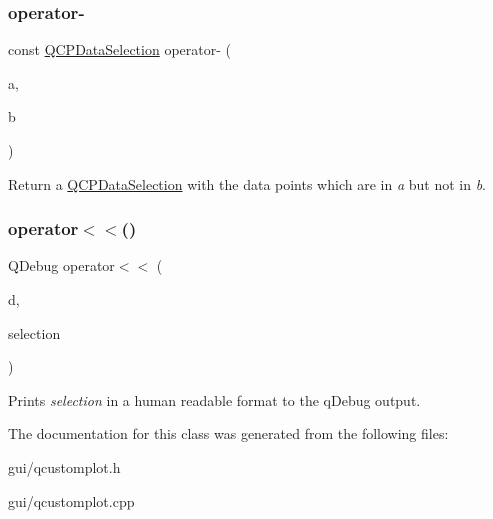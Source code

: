 \subsubsection{\texorpdfstring{operator-\/}{operator-}\hspace{0.1cm}{\footnotesize\ttfamily [4/4]}}
{\footnotesize\ttfamily const \hyperlink{classQCPDataSelection}{Q\+C\+P\+Data\+Selection} operator-\/ (\begin{DoxyParamCaption}\item[{const \hyperlink{classQCPDataRange}{Q\+C\+P\+Data\+Range} \&}]{a,  }\item[{const \hyperlink{classQCPDataRange}{Q\+C\+P\+Data\+Range} \&}]{b }\end{DoxyParamCaption})\hspace{0.3cm}{\ttfamily [friend]}}

Return a \hyperlink{classQCPDataSelection}{Q\+C\+P\+Data\+Selection} with the data points which are in {\itshape a} but not in {\itshape b}. \mbox{\label{classQCPDataSelection_aed65b8988afe6b03adeadf5edf663670}} 
\subsubsection{\texorpdfstring{operator$<$$<$()}{operator<<()}}
{\footnotesize\ttfamily Q\+Debug operator$<$$<$ (\begin{DoxyParamCaption}\item[{Q\+Debug}]{d,  }\item[{const \hyperlink{classQCPDataSelection}{Q\+C\+P\+Data\+Selection} \&}]{selection }\end{DoxyParamCaption})\hspace{0.3cm}{\ttfamily [related]}}

Prints {\itshape selection} in a human readable format to the q\+Debug output. 

The documentation for this class was generated from the following files\+:\begin{DoxyCompactItemize}
\item 
gui/qcustomplot.\+h\item 
gui/qcustomplot.\+cpp\end{DoxyCompactItemize}
